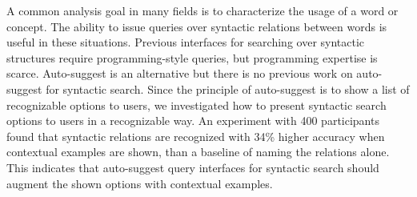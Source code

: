 
A common analysis goal in many fields is to characterize the usage of a word or concept. The ability to issue queries over syntactic relations between words is useful in these situations.  Previous interfaces for  searching over syntactic structures require programming-style queries, but programming expertise is scarce. Auto-suggest is an alternative but there is no previous work on auto-suggest for syntactic search. Since the principle of auto-suggest is to show a list of recognizable options to users, we investigated how to present syntactic search options to users in a recognizable way. An experiment with 400 participants found that syntactic relations are recognized with 34\% higher accuracy when contextual examples are shown, than a baseline of naming the relations alone.  This indicates that auto-suggest query interfaces for syntactic search should augment the shown options with contextual examples.
